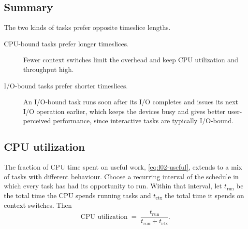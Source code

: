 \documentclass[../main.tex]{subfiles}
\begin{document}
\subsection{Summary}

The two kinds of tasks prefer opposite timeslice lengths.
\begin{description}
  \item[CPU-bound tasks prefer longer timeslices.]  Fewer context switches
    limit the overhead and keep CPU utilization and throughput high.
  \item[I/O-bound tasks prefer shorter timeslices.]  An I/O-bound task runs
    soon after its I/O completes and issues its next I/O operation earlier,
    which keeps the devices busy and gives better user-perceived
    performance, since interactive tasks are typically
    I/O-bound.
\end{description}

\subsection{CPU utilization}

The fraction of CPU time spent on useful work, \cref{eq:l02-useful},
extends to a mix of tasks with different behaviour.  Choose a recurring
interval of the schedule in which every task has had its opportunity to
run.  Within that interval, let $t_{\mathrm{run}}$ be the total time the CPU
spends running tasks and $t_{\mathrm{ctx}}$ the total time it spends on
context switches.  Then
\begin{equation}
  \text{CPU utilization} \;=\;
  \frac{t_{\mathrm{run}}}{t_{\mathrm{run}} + t_{\mathrm{ctx}}} .
  \label{eq:l07-utilization}
\end{equation}
\end{document}
